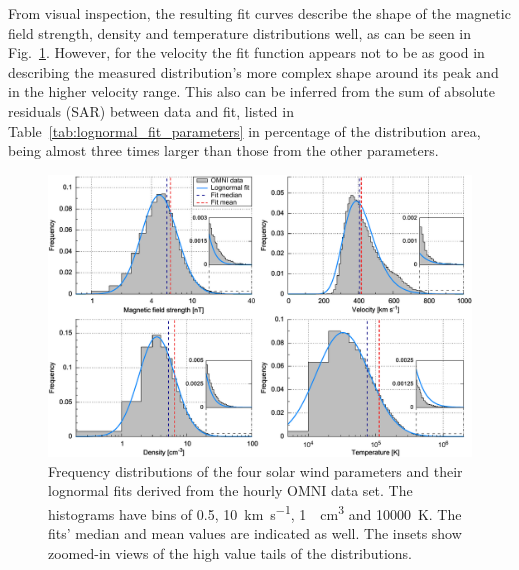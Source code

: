 From visual inspection, the resulting fit curves describe the shape of the magnetic field strength, density and temperature distributions well, as can be seen in Fig.~\ref{fig:histogram_fits_4_a_zoom_paper_pdfplot}. However, for the velocity the fit function appears not to be as good in describing the measured distribution’s more complex shape around its peak and in the higher velocity range. This also can be inferred from the sum of absolute residuals (SAR) between data and fit, listed in Table~\ref{tab:lognormal_fit_parameters} in percentage of the distribution area, being almost three times larger than those from the other parameters.
\begin{figure}
	\includegraphics[width=18cm]{figures/histogram_fits_4_a_zoom_paper_pdfplot.pdf}
	\caption{Frequency distributions of the four solar wind parameters and their lognormal fits derived from the hourly OMNI data set. The histograms have bins of \SI{0.5}{\nT}, \SI{10}{\km\per\s}, \SI{1}{\per\cm\cubed} and \SI{10000}{\K}. The fits' median and mean values are indicated as well. The insets show zoomed-in views of the high value tails of the distributions.}
	\label{fig:histogram_fits_4_a_zoom_paper_pdfplot}
\end{figure}

